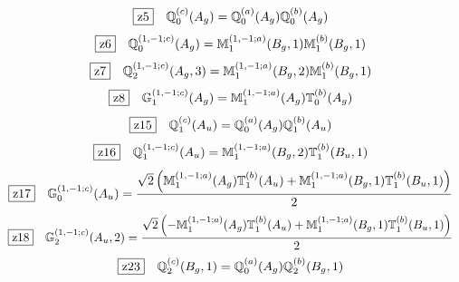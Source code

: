 \documentclass[fleqn,10pt,landscape]{jsarticle}
\begin{document}
\begin{dmath*}
\hspace*{3mm}\fbox{z5}\quad \mathbb{Q}_{0}^{(c)}(A_{g})=\mathbb{Q}_{0}^{(a)}(A_{g}) \mathbb{Q}_{0}^{(b)}(A_{g})
\end{dmath*}
\begin{dmath*}
\hspace*{3mm}\fbox{z6}\quad \mathbb{Q}_{0}^{(1,-1;c)}(A_{g})=\mathbb{M}_{1}^{(1,-1;a)}(B_{g},1) \mathbb{M}_{1}^{(b)}(B_{g},1)
\end{dmath*}
\begin{dmath*}
\hspace*{3mm}\fbox{z7}\quad \mathbb{Q}_{2}^{(1,-1;c)}(A_{g},3)=\mathbb{M}_{1}^{(1,-1;a)}(B_{g},2) \mathbb{M}_{1}^{(b)}(B_{g},1)
\end{dmath*}
\begin{dmath*}
\hspace*{3mm}\fbox{z8}\quad \mathbb{G}_{1}^{(1,-1;c)}(A_{g})=\mathbb{M}_{1}^{(1,-1;a)}(A_{g}) \mathbb{T}_{0}^{(b)}(A_{g})
\end{dmath*}
\begin{dmath*}
\hspace*{3mm}\fbox{z15}\quad \mathbb{Q}_{1}^{(c)}(A_{u})=\mathbb{Q}_{0}^{(a)}(A_{g}) \mathbb{Q}_{1}^{(b)}(A_{u})
\end{dmath*}
\begin{dmath*}
\hspace*{3mm}\fbox{z16}\quad \mathbb{Q}_{1}^{(1,-1;c)}(A_{u})=\mathbb{M}_{1}^{(1,-1;a)}(B_{g},2) \mathbb{T}_{1}^{(b)}(B_{u},1)
\end{dmath*}
\begin{dmath*}
\hspace*{3mm}\fbox{z17}\quad \mathbb{G}_{0}^{(1,-1;c)}(A_{u})=\frac{\sqrt{2} \left(\mathbb{M}_{1}^{(1,-1;a)}(A_{g}) \mathbb{T}_{1}^{(b)}(A_{u}) + \mathbb{M}_{1}^{(1,-1;a)}(B_{g},1) \mathbb{T}_{1}^{(b)}(B_{u},1)\right)}{2}
\end{dmath*}
\begin{dmath*}
\hspace*{3mm}\fbox{z18}\quad \mathbb{G}_{2}^{(1,-1;c)}(A_{u},2)=\frac{\sqrt{2} \left(- \mathbb{M}_{1}^{(1,-1;a)}(A_{g}) \mathbb{T}_{1}^{(b)}(A_{u}) + \mathbb{M}_{1}^{(1,-1;a)}(B_{g},1) \mathbb{T}_{1}^{(b)}(B_{u},1)\right)}{2}
\end{dmath*}
\begin{dmath*}
\hspace*{3mm}\fbox{z23}\quad \mathbb{Q}_{2}^{(c)}(B_{g},1)=\mathbb{Q}_{0}^{(a)}(A_{g}) \mathbb{Q}_{2}^{(b)}(B_{g},1)
\end{dmath*}
\end{document}
